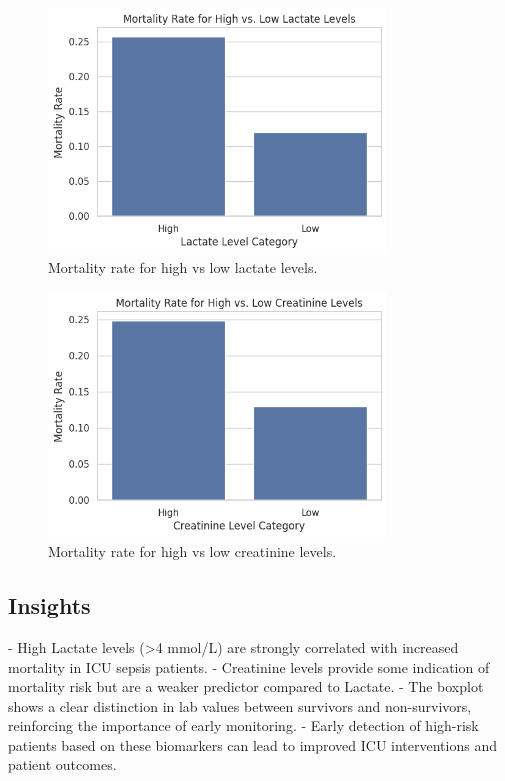 \documentclass[a4paper,10pt]{article}
\begin{document}
\begin{figure}[h]
    \centering
    \includegraphics[width=0.8\textwidth]{figure4c.png}
    \caption{Mortality rate for high vs low lactate levels.}
    \label{fig:lactate_mortality}
\end{figure}

\begin{figure}[h]
    \centering
    \includegraphics[width=0.8\textwidth]{figure4d.png}
    \caption{Mortality rate for high vs low creatinine levels.}
    \label{fig:creatinine_mortality}
\end{figure}

\clearpage

\subsection{Insights}
- High Lactate levels (\textgreater 4 mmol/L) are strongly correlated with increased mortality in ICU sepsis patients.
- Creatinine levels provide some indication of mortality risk but are a weaker predictor compared to Lactate.
- The boxplot shows a clear distinction in lab values between survivors and non-survivors, reinforcing the importance of early monitoring.
- Early detection of high-risk patients based on these biomarkers can lead to improved ICU interventions and patient outcomes.
\end{document}
